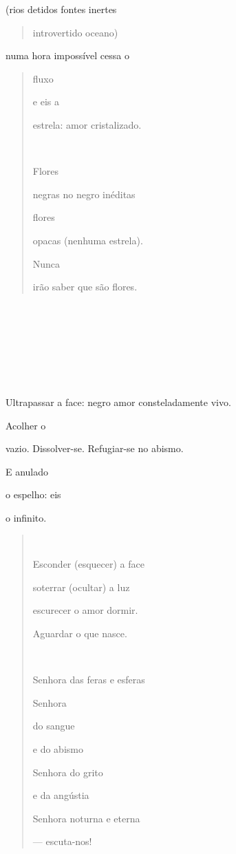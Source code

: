 (rios detidos fontes inertes

\begin{quote}
introvertido oceano)
\end{quote}

numa hora impossível cessa o

\begin{quote}
fluxo

e eis a

estrela: amor cristalizado.



Flores

negras no negro inéditas

flores

opacas (nenhuma estrela).

Nunca

irão saber que são flores.
\end{quote}









Ultrapassar a face: negro amor consteladamente vivo.

Acolher o

vazio. Dissolver-se. Refugiar-se no abismo.

E anulado

o espelho: eis

o infinito.

\begin{quote}


Esconder (esquecer) a face

soterrar (ocultar) a luz

escurecer o amor dormir.

Aguardar o que nasce.



Senhora das feras e esferas

Senhora

do sangue

e do abismo

Senhora do grito

e da angústia

Senhora noturna e eterna

--- escuta-nos!
\end{quote}

\subsection{}\label{section-13}

